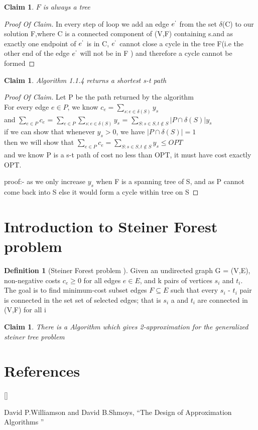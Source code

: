 \documentclass[11pt]{article}
\numberwithin{equation}{section}
\newtheorem{claim}[theorem]{Claim}
\theoremstyle{definition}
\newtheorem{definition}[theorem]{Definition}
\def\beginrefs{\begin{list}%
		{[\arabic{equation}]}{\usecounter{equation}
			\setlength{\leftmargin}{2.0truecm}\setlength{\labelsep}{0.4truecm}%
			\setlength{\labelwidth}{1.6truecm}}}
\def\endrefs{\end{list}}
\def\bibentry#1{\item[\hbox{[#1]}]}
\begin{document}
	\begin{claim}
		$F$ is always a tree 
	\end{claim}
	\begin{proof}[Proof Of Claim]
         In every step of loop we add an edge $e^{`}$ from the set $\delta$(C) to our solution F,where C is a connected component of (V,F) containing s.and as exactly one endpoint of $e^{`}$ is in C, $e^{`}$ cannot close a cycle in the tree F(i.e the other end of the edge $e^{`}$ will not be in F ) and  therefore a cycle cannot be formed 
	\end{proof}

	\begin{claim}
	  Algorithm 1.1.4 returns a shortest s-t path 
	\end{claim}
	\begin{proof}[Proof Of Claim]
      Let P be the path returned by the algorithm  \\
      For every edge $e\in P $, we know $c_e =  \sum_{s: e\in \delta(S) }y_s $  \\
      and  $\sum_{e \in P }c_e$ =  $\sum_{e \in P }\sum_{s: e\in \delta(S) }y_s $  = $\sum_{S: s\in S,t\notin S}|P \cap \delta (S) |y_s$\\
       if we can show that whenever $y_s>0$, we have $|P\cap \delta (S)| = 1$ \\ then we will show that  $\sum_{e \in P }c_e  = \sum_{S: s\in S,t\notin S}y_s \leq OPT$ \\
       and we know P is a s-t path of cost no less than OPT, it must have cost exactly OPT.

       proof:- as we only increase $y_s$ when F is a spanning tree of S, and as P cannot come back into S else it would form a cycle within tree on S 
       
	\end{proof}

\section{Introduction to Steiner Forest problem}

\begin{definition}[Steiner Forest problem ]
Given an undirected graph G  = (V,E), non-negative costs $c_e \geq 0$ for all edges $e \in E$, and k pairs of  vertices $s_i$ and $t_i$. The goal is to find minimum-cost subset edges $F \subseteq E$ such that every  $s_i$ - $t_i$ pair is connected in the set set of selected edges; that is  $s_i$ a and  $t_i$ are connected in (V,F) for all i 
\end{definition}

\begin{claim}
	There is a Algorithm which gives 2-approximation for the generalized steiner tree problem 
	\end{claim}
 
\section*{References}
\beginrefs
\bibentry{CW87}{\sc David P.Williamson } and {\sc David B.Shmoys}, 
``The Design of Approximation Algorithms ''
\endrefs

\end{document}
